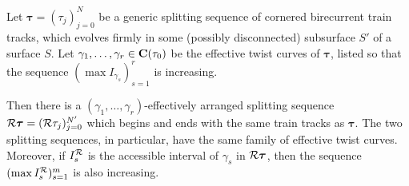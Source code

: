 \begin{prop}\label{prp:rearrang2}
Let $\bm\tau=(\tau_j)_{j=0}^N$ be a generic splitting sequence of cornered birecurrent train tracks, which evolves firmly in some (possibly disconnected) subsurface $S'$ of a surface $S$. Let $\gamma_1,\ldots,\gamma_r\in\mathbf C(\tau_0)$ be the effective twist curves of $\bm\tau$, listed so that the sequence $(\max I_{\gamma_s})_{s=1}^r$ is increasing.

Then there is a $(\gamma_1,\ldots,\gamma_r)$-effectively arranged splitting sequence ${\mathcal R}\bm\tau=({\mathcal R}\tau_j)_{j=0}^{N'}$ which begins and ends with the same train tracks as $\bm\tau$. The two splitting sequences, in particular, have the same family of effective twist curves. Moreover, if $I^{\mathcal R}_s$ is the accessible interval of $\gamma_s$ in ${\mathcal R}\bm\tau$, then the sequence $(\max I^{\mathcal R}_s)_{s=1}^m$ is also increasing.
\end{prop}

